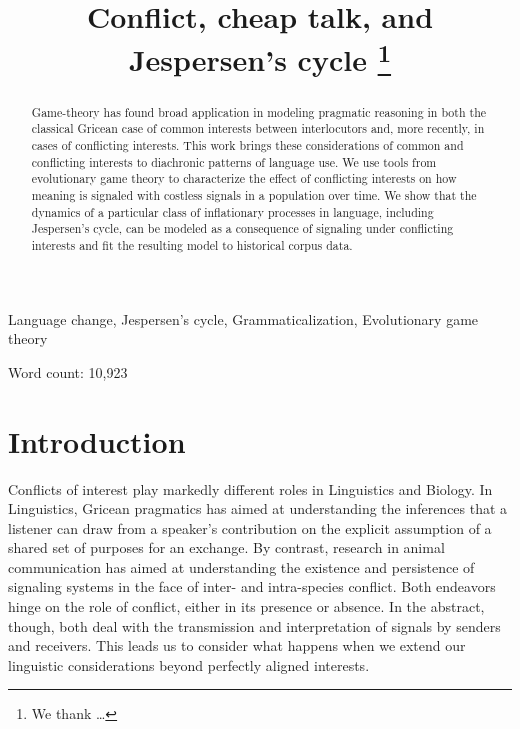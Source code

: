 \documentclass[linguex]{sp}
\title[Conflict, cheap talk, and Jespersen's cycle]{Conflict, cheap talk, and Jespersen's cycle \thanks{We thank  \ldots}}
\author[Ahern \& Clark]{ 
  \spauthor{Christopher Ahern \\ \institute{Department of Linguistics,\\ University of Pennsylvania}} \AND
  \spauthor{Robin Clark \\ \institute{Department of Linguistics,\\ University of Pennsylvania}}
}
\theoremstyle{definition} \newtheorem{definition}{Definition}
\begin{document}
\maketitle

\begin{abstract}
Game-theory has found broad application in modeling pragmatic reasoning in both the classical Gricean case of common interests between interlocutors and, more recently, in cases of conflicting interests. This work brings these considerations of common and conflicting interests to diachronic patterns of language use. We use tools from  evolutionary game theory to characterize the effect of conflicting interests on how meaning is signaled with costless signals in a population over time. We show that the dynamics of a particular class of inflationary processes in language, including Jespersen's cycle, can be modeled as a consequence of signaling under conflicting interests and fit the resulting model to historical corpus data.
\end{abstract}

\begin{keywords}
	 Language change, Jespersen's cycle, Grammaticalization, Evolutionary game theory
\end{keywords}

\noindent
Word count: 10,923

\section{Introduction}
\label{Introduction}

Conflicts of interest play markedly different roles in Linguistics and Biology. In Linguistics, Gricean pragmatics has aimed at understanding the inferences that a listener can draw from a speaker's contribution on the explicit assumption of a shared set of purposes for an exchange. By contrast, research in animal communication has aimed at understanding the existence and persistence of signaling systems in the face of inter- and intra-species conflict.  Both endeavors hinge on the role of conflict, either in its presence or absence. In the abstract, though, both deal with the transmission and interpretation of signals by senders and receivers. This leads us to consider what happens when we extend our linguistic considerations beyond perfectly aligned interests. 
\end{document}
